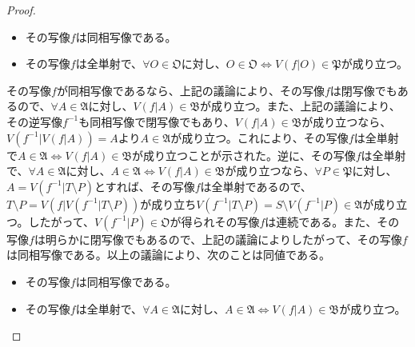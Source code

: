 \documentclass[dvipdfmx]{jsarticle}
\begin{document}
\begin{proof}
\begin{itemize}
\item
  その写像$f$は同相写像である。
\item
  その写像$f$は全単射で、$\forall O \in \mathfrak{O}$に対し、$O \in \mathfrak{O \Leftrightarrow}V\left( f|O \right)\in \mathfrak{P}$が成り立つ。
\end{itemize}\par
その写像$f$が同相写像であるなら、上記の議論により、その写像$f$は閉写像でもあるので、$\forall A \in \mathfrak{A}$に対し、$V\left( f|A \right) \in \mathfrak{B}$が成り立つ。また、上記の議論により、その逆写像$f^{- 1}$も同相写像で閉写像でもあり、$V\left( f|A \right)\in \mathfrak{B}$が成り立つなら、$V\left( f^{- 1}|V\left( f|A \right) \right) = A$より$A \in \mathfrak{A}$が成り立つ。これにより、その写像$f$は全単射で$A \in \mathfrak{A} \Leftrightarrow V\left( f|A \right) \in \mathfrak{B}$が成り立つことが示された。逆に、その写像$f$は全単射で、$\forall A \in \mathfrak{A}$に対し、$A \in \mathfrak{A} \Leftrightarrow V\left( f|A \right) \in \mathfrak{B}$が成り立つなら、$\forall P \in \mathfrak{P}$に対し、$A = V\left( f^{- 1}|T \setminus P \right)$とすれば、その写像$f$は全単射であるので、$T \setminus P = V\left( f|V\left( f^{- 1}|T \setminus P \right) \right)$が成り立ち$V\left( f^{- 1}|T \setminus P \right) = S \setminus V\left( f^{- 1}|P \right) \in \mathfrak{A}$が成り立つ。したがって、$V\left( f^{- 1}|P \right)\in \mathfrak{O}$が得られその写像$f$は連続である。また、その写像$f$は明らかに閉写像でもあるので、上記の議論によりしたがって、その写像$f$は同相写像である。以上の議論により、次のことは同値である。
\begin{itemize}
\item
  その写像$f$は同相写像である。
\item
  その写像$f$は全単射で、$\forall A \in \mathfrak{A}$に対し、$A \in \mathfrak{A \Leftrightarrow}V\left( f|A \right)\in \mathfrak{B}$が成り立つ。
\end{itemize}\par

\end{proof}
\end{document}
